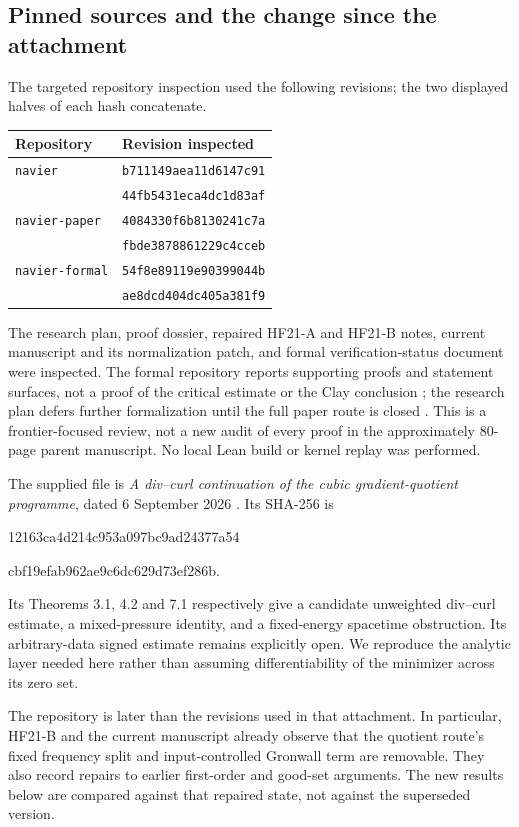 \documentclass[11pt,a4paper]{article}
\theoremstyle{definition}
\theoremstyle{remark}
\newcommand{\repo}[1]{{\small\texttt{#1}}}
\numberwithin{equation}{section}
\begin{document}
\subsection{Pinned sources and the change since the attachment}
The targeted repository inspection used the following revisions; the two displayed halves of each hash concatenate.
\begin{center}
\begin{tabular}{@{}lp{99mm}@{}}
\toprule
Repository & Revision inspected\\
\midrule
\repo{navier} & \repo{b711149aea11d6147c91}\\[-2pt]
& \repo{44fb5431eca4dc1d83af}\\
\repo{navier-paper} & \repo{4084330f6b8130241c7a}\\[-2pt]
& \repo{fbde3878861229c4cceb}\\
\repo{navier-formal} & \repo{54f8e89119e90399044b}\\[-2pt]
& \repo{ae8dcd404dc405a381f9}\\
\bottomrule
\end{tabular}
\end{center}
The research plan, proof dossier, repaired HF21-A and HF21-B notes, current manuscript and its normalization patch, and formal verification-status document were inspected. The formal repository reports supporting proofs and statement surfaces, not a proof of the critical estimate or the Clay conclusion \cite{Formal}; the research plan defers further formalization until the full paper route is closed \cite{Research}. This is a frontier-focused review, not a new audit of every proof in the approximately 80-page parent manuscript. No local Lean build or kernel replay was performed.

The supplied file is \emph{A div--curl continuation of the cubic gradient-quotient programme}, dated 6 September 2026 \cite{Attachment}. Its SHA-256 is
\begin{center}\small\ttfamily
12163ca4d214c953a097bc9ad24377a54\par
cbf19efab962ae9c6dc629d73ef286b.
\end{center}
Its Theorems 3.1, 4.2 and 7.1 respectively give a candidate unweighted div--curl estimate, a mixed-pressure identity, and a fixed-energy spacetime obstruction. Its arbitrary-data signed estimate remains explicitly open. We reproduce the analytic layer needed here rather than assuming differentiability of the minimizer across its zero set.

The repository is later than the revisions used in that attachment. In particular, HF21-B and the current manuscript already observe that the quotient route's fixed frequency split and input-controlled Gronwall term are removable. They also record repairs to earlier first-order and good-set arguments. The new results below are compared against that repaired state, not against the superseded version.
\end{document}

